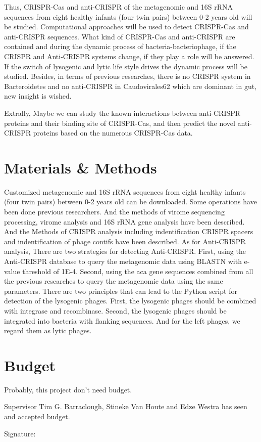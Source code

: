 \documentclass[a4paper]{article}
\theoremstyle{definition}
\numberwithin{equation}{section}
\begin{document}
Thus, CRISPR-Cas and anti-CRISPR of the metagenomic and 16S rRNA sequences from eight healthy infants (four twin pairs) between 0-2 years old \citep{lim2015early} will be studied. Computational approaches will be used to detect CRISPR-Cas and anti-CRISPR sequences. What kind of CRISPR-Cas and anti-CRISPR are contained and during the dynamic process of bacteria-bacteriophage, if the CRISPR and Anti-CRISPR systems change, if they play a role will be answered. If the switch of lysogenic and lytic life style drives the dynamic process will be studied. Besides, in terms of previous researches, there is no CRISPR system in Bacteroidetes and no anti-CRISPR in Caudovirales62 which are dominant in gut, new insight is wished. 

Extrally, Maybe we can study the known interactions between anti-CRISPR proteins and their binding site of CRISPR-Cas, and then predict the novel anti-CRISPR proteins based on the numerous CRISPR-Cas data\citep{alipanahi2015predicting}.

\section{Materials \& Methods}
Customized metagenomic and 16S rRNA sequences from eight healthy infants (four twin pairs) between 0-2 years old\citep{lim2015early} can be downloaded. Some operations have been done previous researchers. And the methods of virome sequencing processing, virome analysis and 16S rRNA gene analysis have been described\citep{lim2015early}. And the Methods of CRISPR analysis including indentification CRISPR spacers and indentification of phage contifs have been described\citep{stern2012crispr}. As for Anti-CRISPR analysis, There are two strategies for detecting Anti-CRISPR. First, using the Anti-CRISPR database to query the metagenomic data using BLASTN with e-value threshold of 1E-4. Second, using the aca gene sequences combined from all the previous researches to query the metagenomic data using the same parameters. There are two principles\citep{stern2012crispr} that can lead to the Python script for detection of the lysogenic phages. First, the lysogenic phages should be combined with integrase and recombinase. Second, the lysogenic phages should be integrated into bacteria with flanking sequences. And for the left phages, we regard them as lytic phages.


\section{Budget}
Probably, this project don't need budget.
    
Supervisor Tim G. Barraclough, Stineke Van Houte and Edze Westra has seen and accepted budget.

Signature:

\newpage


\end{document}
